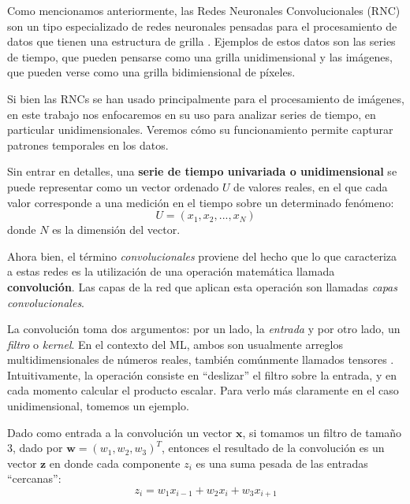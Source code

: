 \documentclass[../../main.tex]{subfiles}
\begin{document}
Como mencionamos anteriormente, las Redes Neuronales Convolucionales (RNC) son un tipo
especializado de redes neuronales pensadas para el procesamiento de datos que tienen una
estructura de grilla \cite{deep-learning}. Ejemplos de estos datos son las series de
tiempo, que pueden pensarse como una grilla unidimensional y las imágenes, que pueden
verse como una grilla bidimiensional de píxeles.

Si bien las RNCs se han usado principalmente para el procesamiento de imágenes, en este
trabajo nos enfocaremos en su uso para analizar series de tiempo, en particular
unidimensionales. Veremos cómo su funcionamiento permite capturar patrones temporales en
los datos.

Sin entrar en detalles\footnotemark, una \textbf{serie de tiempo univariada o
unidimensional} se puede representar como un vector ordenado \(U\) de valores reales, en
el que cada valor corresponde a una medición en el tiempo sobre un determinado fenómeno:
\[
    U = (x_1, x_2, ..., x_N)
\]
donde \(N\) es la dimensión del vector.

Ahora bien, el término \textit{convolucionales} proviene del hecho que lo que caracteriza
a estas redes es la utilización de una operación matemática llamada
\textbf{convolución}\footnotemark \cite{deep-learning}. Las capas de la red que aplican
esta operación son llamadas \textit{capas convolucionales}. 

La convolución toma dos argumentos: por un lado, la \textit{entrada} y por otro lado, un
\textit{filtro} o \textit{kernel}. En el contexto del ML, ambos son usualmente arreglos
multidimensionales de números reales, también comúnmente llamados tensores
\cite{deep-learning}. Intuitivamente, la operación consiste en ``deslizar'' el filtro
sobre la entrada, y en cada momento calcular el producto escalar. Para verlo más
claramente en el caso unidimensional, tomemos un ejemplo.

Dado como entrada a la convolución un vector \(\bm{x}\), si tomamos un filtro de
tamaño 3, dado por \(\bm{w}=(w_1, w_2, w_3)^T\), entonces el resultado de la convolución
es un vector \(\bm{z}\) en donde cada componente \(z_i\) es una suma pesada de las
entradas ``cercanas'':
\[z_i = w_1 x_{i-1} + w_2 x_{i} + w_3 x_{i+1}\]
\end{document}
